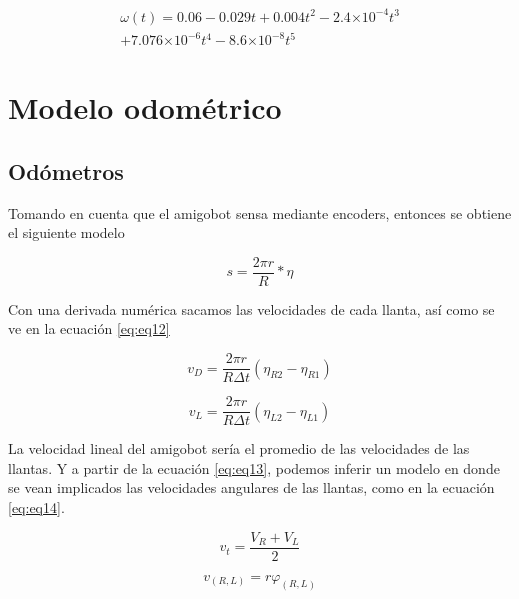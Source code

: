 \documentclass[spanish,10pt,letterpaper, twocolumn]{article}
\providecommand{\e}[1]{\ensuremath{\times 10^{#1}}}
\begin{document}
\begin{equation}
	\label{eq:eq9}
	\begin{matrix}
		\omega (t)=0.06-0.029t+0.004t^2-2.4\e{-4} t^3 \\
		 +7.076\e{-6}t^4-8.6\e{-8}t^5
	\end{matrix}
\end{equation}



\section{Modelo odom\'etrico}

\subsection{Od\'ometros}
Tomando en cuenta que el amigobot sensa mediante encoders, entonces se obtiene el siguiente modelo

\begin{equation}
	\label{eq:eq10}
	s=\frac{2\pi r}{R}* \eta
\end{equation}

Con una derivada num\'erica sacamos las velocidades de cada llanta, as\'i como se ve en la ecuaci\'on \eqref{eq:eq12}

\begin{equation*}
	\label{eq:eq11}
	v_D=\frac{2\pi r}{R \Delta t}(\eta_{R2}-\eta_{R1})
\end{equation*}

\begin{equation}
	\label{eq:eq12}
	v_L=\frac{2\pi r}{R \Delta t}(\eta_{L2}-\eta_{L1})
\end{equation}

La velocidad lineal del amigobot ser\'ia el promedio de las velocidades de las llantas. Y a partir de la ecuaci\'on \eqref{eq:eq13}, podemos inferir un modelo en donde se vean implicados las velocidades angulares de las llantas, como en la ecuaci\'on \eqref{eq:eq14}.


\begin{equation}
	\label{eq:eq13}
	v_t=\frac{V_R+V_L}{2}
\end{equation}

\begin{equation*}
	v_{(R,L)}=r \varphi_{(R,L)}
\end{equation*}
\end{document}
